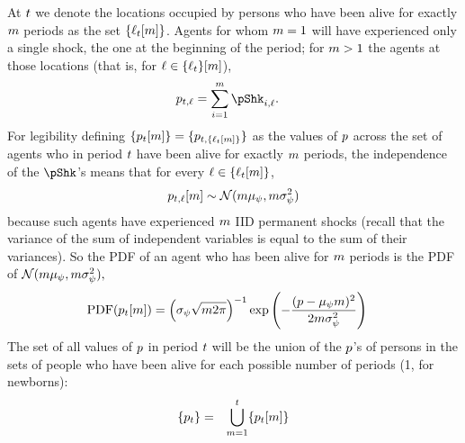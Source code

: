 \documentclass[\econtexRoot/BufferStockTheory.tex]{subfiles}
\begin{document}
At ${}t$ we denote the locations occupied by persons who have been alive for exactly $m$ periods as the set $\{\ell_{{}t}[m]\}$. Agents for whom $m=1$ will have experienced only a single shock, the one at the beginning of the period; for $m>1$ the agents at those locations (that is, for $\ell \in \{\ell_{{}t}\}[m]$),
\begin{align}
  \pLog_{{\tp}\FutPer,\posn}  & = \sum_{\NewPer=1}^{\LooPer}\pShk_{{\tp}\NewPer,\posn}.
\end{align}
For legibility defining $\{p_{{}t}[m]\} = \{p_{{}t,\{\ell_{{}t}[m]\}}\}$ as the values of $p$ across the set of agents who in period ${}t$ have been alive for exactly $m$ periods, the independence of the $\pShk$'s means that for every $\ell \in \{\ell_{t}[m]\}$,
\begin{align}
  p_{t,\ell}[m] \sim \mathcal{N}(m \mu_{\psi},m \sigma^{2}_{\psi}) \label{eq:dstpnm}
\end{align}
because such agents have experienced $m$ IID permanent shocks (recall that the variance of the sum of independent variables is equal to the sum of their variances).
\newcommand{\PDF}{\textrm{PDF}}
So the PDF of an agent who has been alive for $m$ periods is the PDF of $\mathcal{N}(m \mu_{\psi},m \sigma^{2}_{\psi}),$
\begin{align}
  \PDF(\pLog_{\FutPer}[\LooPer]) & = \left(
                                   {\sigma_{\DnsShk}\sqrt{\LooPer 2 \pi}}\right)^{-1} \exp\left(-\frac{(\pLog- \pShkMean \LooPer )^{2}}{2 \LooPer \sigma^{2}_{\DnsShk}}\right)
\end{align}
\newpage
The set of all values of $p$ in period $t$ will be the union of the $p$'s of persons in the sets of people who have been alive for each possible number of periods (1, for newborns):
\begin{eqnarray}
  \{p_{t}\} & = & \bigcup_{m=1}^{t}\{p_{t}[m]\}
\end{eqnarray}
\end{document}
